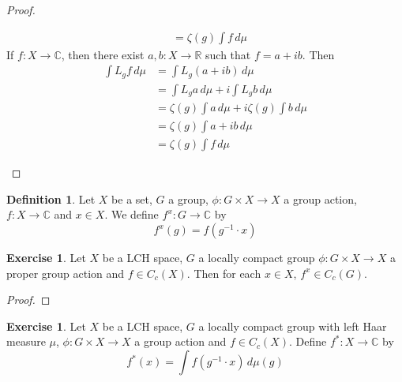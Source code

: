 \documentclass[12pt]{amsart}
\theoremstyle{definition}
\newtheorem{defn}[definition]{Definition}
\newtheorem{ex}[definition]{Exercise}
\newcommand{\C}{\mathbb{C}}
\newcommand{\R}{\mathbb{R}}
\newcommand{\dmu}{\, d \mu}
\begin{document}
\begin{proof}
\begin{enumerate}
\begin{align*}
			&= \zeta(g) \int f \dmu 
		\end{align*} 
		If $f:X \rightarrow \C$, then there exist $a,b:X \rightarrow \R$ such that $f = a + ib$. Then 
		\begin{align*}
			\int L_g f \dmu
			&= \int L_g(a + i b) \dmu \\
			&= \int L_g a \dmu +i \int L_g b \dmu \\
			&= \zeta(g) \int a \dmu + i \zeta(g) \int b \dmu \\
			&= \zeta(g) \int a + ib \dmu \\
			&= \zeta(g) \int f \dmu 
		\end{align*} 
		\end{enumerate}
	\end{proof}

	\begin{defn}
		Let $X$ be a set, $G$ a group, $\phi: G \times X \rightarrow X$ a group action, $f :X \rightarrow \C$ and $x \in X$. We define $f^x: G \rightarrow \C$ by $$f^x(g) = f(g^{-1} \cdot x)$$
	\end{defn}

	\begin{ex}
		Let $X$ be a LCH space, $G$ a locally compact group $\phi: G \times X \rightarrow X$ a proper group action and $f \in C_c(X)$. Then for each $x \in X$, $f^x \in C_c(G)$.  
	\end{ex}

	\begin{proof}
		
	\end{proof}

	\begin{ex}
		Let $X$ be a LCH space, $G$ a locally compact group with left Haar measure $\mu$, $\phi: G \times X \rightarrow X$ a group action and $f \in C_c(X)$. Define $f^* :X \rightarrow \C$ by $$f^*(x) = \int f(g^{-1} \cdot x) \dmu(g)$$  
	\end{ex}


	
	
	
	
	
	
	
	
	
	
	
	
	
	
	
	
	
	
	
	
	
	
	
	
\end{document}
